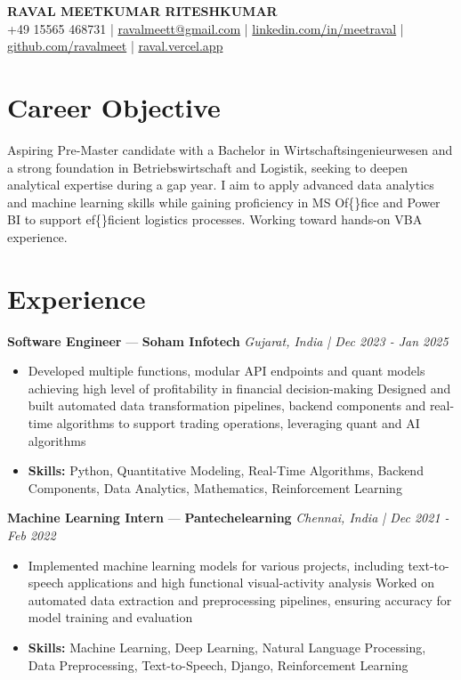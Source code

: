 \documentclass[a4paper,10pt]{article}
\begin{document}
\begin{center}
  {\Large\bfseries RAVAL MEETKUMAR RITESHKUMAR}\\[2pt]
  {\small +49 15565 468731 \;|\; \href{mailto:ravalmeett@gmail.com}{ravalmeett@gmail.com} \;|\; \href{https://www.linkedin.com/in/meetraval/}{linkedin.com/in/meetraval} \;|\; \href{https://github.com/ravalmeet}{github.com/ravalmeet} \;|\; \href{https://raval.vercel.app/}{raval.vercel.app}}
\end{center}
\vspace{-3pt}

\section*{Career Objective}
Aspiring Pre-Master candidate with a Bachelor in Wirtschaftsingenieurwesen and a strong foundation in Betriebswirtschaft and Logistik, seeking to deepen analytical expertise during a gap year. I aim to apply advanced data analytics and machine learning skills while gaining proficiency in MS Of\{\}fice and Power BI to support ef\{\}ficient logistics processes. Working toward hands-on VBA experience.\par

\section*{Experience}
\textbf{Software Engineer} — \textbf{Soham Infotech} \hfill \textit{Gujarat, India \;|\; Dec 2023 - Jan 2025}\par
\vspace{1pt}
\begin{itemize}
  \item Developed multiple functions, modular API endpoints and quant models achieving high level of profitability in financial decision-making Designed and built automated data transformation pipelines, backend components and real-time algorithms to support trading operations, leveraging quant and AI algorithms
  \item \textbf{Skills:} Python, Quantitative Modeling, Real-Time Algorithms, Backend Components, Data Analytics, Mathematics, Reinforcement Learning
\end{itemize}
\vspace{3pt}
\textbf{Machine Learning Intern} — \textbf{Pantechelearning} \hfill \textit{Chennai, India \;|\; Dec 2021 - Feb 2022}\par
\vspace{1pt}
\begin{itemize}
  \item Implemented machine learning models for various projects, including text-to-speech applications and high functional visual-activity analysis Worked on automated data extraction and preprocessing pipelines, ensuring accuracy for model training and evaluation
  \item \textbf{Skills:} Machine Learning, Deep Learning, Natural Language Processing, Data Preprocessing, Text-to-Speech, Django, Reinforcement Learning
\end{itemize}
\end{document}
